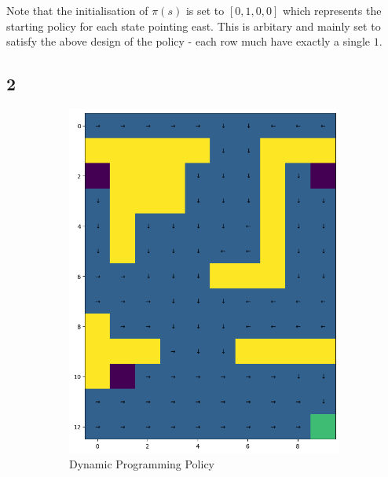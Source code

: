 Note that the initialisation of $\pi(s)$ is set to $[0,1,0,0]$ which 
represents the starting policy for each state pointing east.
This is arbitary and mainly set to satisfy the above design of the 
policy - each row much have exactly a single $1$. 


\subsection*{2}
\begin{figure}[H]
    \centering
    \begin{subfigure}[b]{0.49\textwidth}
        \centering
        \includegraphics[width=\textwidth]{assets/dp/dp_optimal_policy.png}        
        \caption{Dynamic Programming Policy}
    \end{subfigure}
    \hfill 
    \begin{subfigure}[b]{0.49\textwidth}
        \centering

\end{subfigure}
\end{figure}
